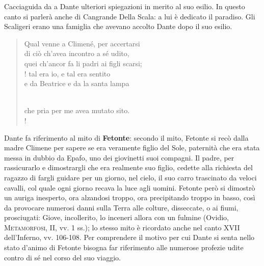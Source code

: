 \documentclass[a4paper, twoside, titlepage]{book}
\newcommand{\titolo}[1]{\textsc{#1}} %
\newcounter{mar}
\newcommand{\mar}[2]{
\addtocounter{mar}{1}
\hspace{-0.73em}\textsuperscript{\hyperref[\thechapter.\themar]{\themar}}\marginpar{\textbf{\themar}\label{\thechapter.\themar}. #2}\hspace{-0.4em}
}
\newcommand{\mat}[1]{\mar{gg}{#1}}
\begin{document}
Cacciaguida da a Dante ulteriori spiegazioni in merito al suo esilio. In questo canto si parlerà anche di Cangrande Della Scala: a lui è dedicato il paradiso.
Gli Scaligeri erano una famiglia che avevano accolto Dante dopo il suo esilio.

\begin{verse}
Qual venne a Climené, per accertarsi\\
di ciò ch’avea incontro a sé udito,\\
quei ch’ancor fa li padri ai figli scarsi;\\!
tal era io, e tal era sentito\\
e da Beatrice e da la santa lampa\mat{Cacciaguida}\\
che pria per me avea mutato sito.\\!
\end{verse}

Dante fa riferimento al mito di \textbf{Fetonte}: secondo il mito, Fetonte si recò dalla madre Climene per sapere se era veramente figlio del Sole, paternità che era stata messa in dubbio da Epafo, uno dei giovinetti suoi compagni. Il padre, per rassicurarlo e dimostrargli che era realmente suo figlio, cedette alla richiesta del ragazzo di fargli guidare per un giorno, nel cielo, il suo carro trascinato da veloci cavalli, col quale ogni giorno recava la luce agli uomini. Fetonte però si dimostrò un auriga inesperto, ora alzandosi troppo, ora precipitando troppo in basso, così da provocare numerosi danni sulla Terra alle colture, disseccate, o ai fiumi, prosciugati: Giove, incollerito, lo inceneri allora con un fulmine (Ovidio, \titolo{Metamorfosi}, II, vv. 1 ss.); lo stesso mito è ricordato anche nel canto XVII dell'Inferno, vv. 106-108. Per comprendere il motivo per cui Dante si senta nello stato d'animo di Fetonte bisogna far riferimento alle numerose profezie udite contro di sé nel corso del suo viaggio.
\end{document}
